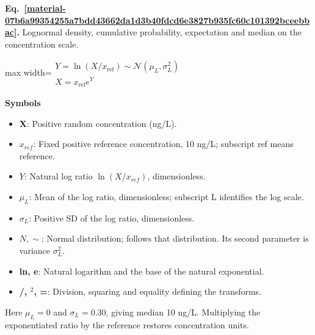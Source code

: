 \documentclass[11pt,a4paper]{article}
\begin{document}
\par\medskip
\begin{samepage}
\label{material-07b6a99354255a7bdd43662da1d3b40fdcd6e3827b935fc60c101392bceebbac}
\noindent\textbf{Eq.~\ref*{material-07b6a99354255a7bdd43662da1d3b40fdcd6e3827b935fc60c101392bceebbac}.} Lognormal density, cumulative probability, expectation and median on the concentration scale.\par\nopagebreak
\begin{center}\begin{adjustbox}{max width=\linewidth}$\displaystyle \begin{gathered}Y=\ln(X/x_{\mathrm{ref}})\sim\mathcal N(\mu_L,\sigma_L^2)\\X=x_{\mathrm{ref}}e^Y\end{gathered}$\end{adjustbox}\end{center}

\par\noindent\textbf{Symbols}

\begin{itemize}\setlength{\itemsep}{1pt}\setlength{\parsep}{0pt}
\item \textbf{X}: Positive random concentration (ng/L).
\item \textbf{\(x_{ref}\)}: Fixed positive reference concentration, 10 ng/L; subscript ref means reference.
\item \textbf{\(Y\)}: Natural log ratio \(\ln(X / x_{ref})\), dimensionless.
\item \textbf{\(μ_L\)}: Mean of the log ratio, dimensionless; subscript L identifies the log scale.
\item \textbf{\(σ_L\)}: Positive SD of the log ratio, dimensionless.
\item \textbf{\(N, ∼\)}: Normal distribution; follows that distribution. Its second parameter is variance \(σ_L^2\).
\item \textbf{ln, e}: Natural logarithm and the base of the natural exponential.
\item \textbf{/, \ensuremath{{}^2}, =}: Division, squaring and equality defining the transforms.
\end{itemize}

Here \(μ_L = 0\) and \(σ_L = 0.30\), giving median 10 ng/L. Multiplying the exponentiated ratio by the reference restores concentration units.

\end{samepage}
\medskip
\end{document}

